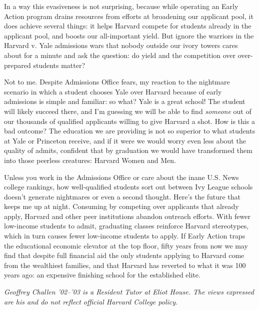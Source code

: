 In a way this evasiveness is not surprising, because while operating an Early
Action program drains resources from efforts at broadening our applicant
pool, it does achieve several things: it helps Harvard compete for students
already in the applicant pool, and boosts our all-important yield. But ignore
the warriors in the Harvard v. Yale admissions wars that nobody outside our
ivory towers cares about for a minute and ask the question: do yield and the
competition over over-prepared students matter?

Not to me. Despite Admissions Office fears, my reaction to the nightmare
scenario in which a student chooses Yale over Harvard because of early
admissions is simple and familiar: so what? Yale is a great school! The
student will likely succeed there, and I'm guessing we will be able to find
\textit{someone} out of our thousands of qualified applicants willing to give
Harvard a shot. How is this a bad outcome? The education we are providing is
not so superior to what students at Yale or Princeton receive, and if it were
we would worry even less about the quality of admits, confident that by
graduation we would have transformed them into those peerless creatures:
Harvard Women and Men.

Unless you work in the Admissions Office or care about the inane U.S. News
college rankings, how well-qualified students sort out between Ivy League
schools doesn't generate nightmares or even a second thought. Here's the
future that keeps me up at night. Consuming by competing over applicants that
already apply, Harvard and other peer institutions abandon outreach efforts.
With fewer low-income students to admit, graduating classes reinforce Harvard
stereotypes, which in turn causes fewer low-income students to apply. If
Early Action traps the educational economic elevator at the top floor, fifty
years from now we may find that despite full financial aid the only students
applying to Harvard come from the wealthiest families, and that Harvard has
reverted to what it was 100 years ago: an expensive finishing school for the
established elite.


\textit{Geoffrey Challen '02--'03 is a Resident Tutor at Eliot House. The
views expressed are his and do not reflect official Harvard College policy.}
